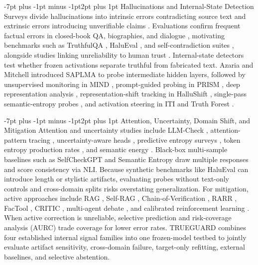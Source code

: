 \documentclass[10pt,twocolumn,letterpaper]{article}
\makeatletter
\renewcommand{\subsection}{\@startsection{subsection}{2}{\z@}%
  {-7pt plus -1pt minus -1pt}{2pt plus 1pt}%
  {\normalfont\normalsize\itshape\color{black}}}
\makeatother
\begin{document}
\subsection{Hallucinations and Internal-State Detection}
Surveys divide hallucinations into intrinsic errors contradicting source text and extrinsic errors introducing unverifiable claims \cite{review35,review18}. Evaluations confirm frequent factual errors in closed-book QA, biographies, and dialogue \cite{review37,review23}, motivating benchmarks such as TruthfulQA \cite{review22}, HaluEval \cite{review29}, and self-contradiction suites \cite{review36}, alongside studies linking unreliability to human trust \cite{review03,review19}. Internal-state detectors test whether frozen activations separate truthful from fabricated text. Azaria and Mitchell \cite{review27} introduced SAPLMA to probe intermediate hidden layers, followed by unsupervised monitoring in MIND \cite{review01}, prompt-guided probing in PRISM \cite{review02}, deep representation analysis \cite{review05}, representation-shift tracking in HalluShift \cite{review13}, single-pass semantic-entropy probes \cite{review14}, and activation steering in ITI \cite{review28} and Truth Forest \cite{review38}.

\subsection{Attention, Uncertainty, Domain Shift, and Mitigation}
Attention and uncertainty studies include LLM-Check \cite{review12}, attention-pattern tracing \cite{review09}, uncertainty-aware heads \cite{review11}, predictive entropy surveys \cite{review07}, token entropy production rates \cite{review17}, and semantic energy \cite{review04}. Black-box multi-sample baselines such as SelfCheckGPT \cite{review21} and Semantic Entropy \cite{kuhn2023semantic,farquhar2024detecting} draw multiple responses and score consistency via NLI. Because synthetic benchmarks like HaluEval \cite{review29} can introduce length or stylistic artifacts, evaluating probes without text-only controls and cross-domain splits risks overstating generalization. For mitigation, active approaches include RAG \cite{review25}, Self-RAG \cite{review26}, Chain-of-Verification \cite{review24}, RARR \cite{review33}, FacTool \cite{review34}, CRITIC \cite{review39}, multi-agent debate \cite{review31}, and calibrated reinforcement learning \cite{review15}. When active correction is unreliable, selective prediction and risk-coverage analysis (AURC) \cite{geifman2017selective} trade coverage for lower error rates. TRUEGUARD combines four established internal signal families into one frozen-model testbed to jointly evaluate artifact sensitivity, cross-domain failure, target-only refitting, external baselines, and selective abstention.
\end{document}
